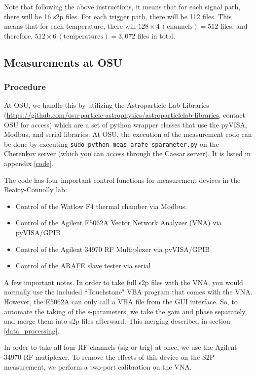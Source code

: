 \documentclass[letter,12pt]{article}
\begin{document}
Note that following the above instructions, it means that for each signal path, there will be 16 s2p files. For each trigger path, there will be 112 files. This means that for each temperature, there will $128 \times 4 \, (\text{channels}) = 512$ files, and therefore, $512 \times 6 \, (\text{temperatures}) = 3,072$ files in total.

\subsection{Measurements at OSU}

\subsubsection{Procedure}

At OSU, we handle this by utilizing the Astroparticle Lab Libraries (\url{https://github.com/osu-particle-astrophysics/astroparticlelab-libraries}, contact OSU for access) which are a set of python wrapper classes that use the pyVISA, Modbus, and serial libraries. At OSU, the execution of the measurement code can be done by executing \texttt{sudo python meas\_arafe\_sparameter.py} on the Cherenkov server (which you can access through the Caesar server). It is listed in appendix \ref{code}.

The code has four important control functions for measurement devices in the Beatty-Connolly lab:
\begin{itemize}
\item Control of the Watlow F4 thermal chamber via Modbus.
\item Control of the Agilent E5062A Vector Network Analyzer (VNA) via pyVISA/GPIB
\item Control of the Agilent 34970 RF Multiplexer via pyVISA/GPIB
\item Control of the ARAFE slave tester via serial
\end{itemize}

A few important notes. In order to take full s2p files with the VNA, you would normally use the included ``Touchstone" VBA program that comes with the VNA. However, the E5062A can only call a VBA file from the GUI interface. So, to automate the taking of the s-parameters, we take the gain and phase separately, and merge them into s2p files afterward. This merging described in section \ref{data_processing}.

In order to take all four RF channels (sig or trig) at once, we use the Agilent 34970 RF mutiplexer. To remove the effects of this device on the S2P measurement, we perform a two-port calibration on the VNA.
\end{document}
